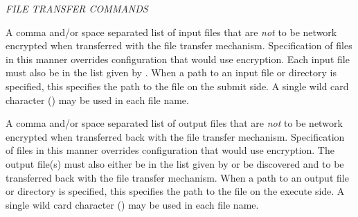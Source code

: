 \begin{description}
\end{description} 

\emph{FILE TRANSFER COMMANDS}
\begin{description} 


\label{man-condor-submit-dont-encrypt-input-files}
\item[dont\_encrypt\_input\_files = $<$ file1,file2,file... $>$] 
A comma and/or space separated list of input files that are \emph{not} to be
network encrypted when transferred with the file transfer mechanism.
Specification of files in this manner overrides configuration that would
use encryption.
Each input file must also be in the list given by
.
When a path to an input file or directory is specified, 
this specifies the path to the file on the submit side.
A single wild card character (\Expr{*}) may be used in each file name.


\label{man-condor-submit-dont-encrypt-output-files}
\item[dont\_encrypt\_output\_files = $<$ file1,file2,file... $>$] 
A comma and/or space separated list of output files that are \emph{not} to be
network encrypted when transferred back with the file transfer mechanism.
Specification of files in this manner overrides configuration that would
use encryption.
The output file(s) must also either be in the list given by
 or be discovered and to be transferred
back with the file transfer mechanism.
When a path to an output file or directory is specified, 
this specifies the path to the file on the execute side.
A single wild card character (\Expr{*}) may be used in each file name.



\end{description}
